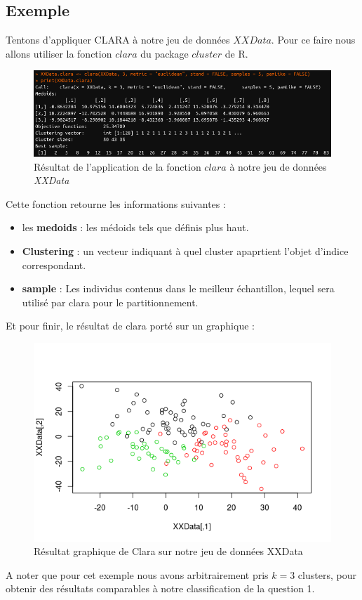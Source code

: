 \documentclass[11pt]{article}
\begin{document}
\subsection{Exemple}
Tentons d'appliquer CLARA à notre jeu de données $XXData$. Pour ce faire nous allons utiliser la fonction $clara$ du package $cluster$ de R.
\begin{figure}[H]
\centering
\includegraphics[scale=.65]{clara.png}
\caption{Résultat de l'application de la fonction $clara$ à notre jeu de données \emph{XXData}}
\end{figure}
\noindent Cette fonction retourne les informations suivantes :
\begin{itemize}
\item les \textbf{medoids}  : les médoids tels que définis plus haut.
\item \textbf{Clustering} : un vecteur indiquant à quel cluster apaprtient l'objet d'indice correspondant.
\item \textbf{sample} : Les individus contenus dans le meilleur échantillon, lequel sera utilisé par clara pour le partitionnement.
\end{itemize}
Et pour finir, le résultat de clara porté sur un graphique :
\begin{figure}[H]
\centering
\includegraphics[scale=1]{claraclass.png}
\caption{Résultat graphique de Clara sur notre jeu de données XXData}
\end{figure}
\noindent A noter que pour cet exemple nous avons arbitrairement pris $k=3$ clusters, pour obtenir des résultats comparables à notre classification de la question 1.
\end{document}
